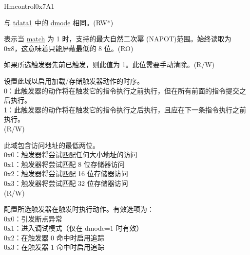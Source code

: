 \begin{register}{H}{mcontrol}{0x7A1}\label{regdesc:MCONTROL}
%
%
%
%
%
%
%
%
%
%
%
%
%
%
%
%
\regnewline%
\begin{regdesc}\begin{reglist}
\label{fielddesc:MCONTROLDMODE}\item [dmode] 与 \hyperref[regdesc:TDATA1]{tdata1} 中的 \hyperref[fielddesc:TDATA1DMODE]{dmode} 相同。(RW*)
\label{fielddesc:MCONTROLMASKMAX}\item [maskmax]
表示当 \hyperref[fielddesc:MCONTROLMATCH]{match} 为 1 时，支持的最大自然二次幂 (NAPOT)范围。始终读取为 0x8，这意味着只能屏蔽最低的 8 位。(RO)
\label{fielddesc:MCONTROLHIT}\item [hit] 如果所选触发器先前已触发，则此值为 1。此位需要手动清除。(R/W)
\label{fielddesc:MCONTROLTIMING}\item [timing] 设置此域以启用加载/存储触发器动作的时序。\\
0：此触发器的动作将在触发它的指令执行之前执行，但在所有前面的指令提交之后执行。\\
1：此触发器的动作将在触发它的指令执行之后执行，且应在下一条指令执行之前执行。\\
(R/W)
\label{fielddesc:MCONTROLSIZELO}\item [sizelo] 此域包含访问地址的最低两位。\\
0x0：触发器将尝试匹配任何大小地址的访问\\
0x1：触发器将尝试匹配 8 位存储器访问\\
0x2：触发器将尝试匹配 16 位存储器访问\\
0x3：触发器将尝试匹配 32 位存储器访问\\
(R/W)
\label{fielddesc:MCONTROLACTION}\item [action] 配置所选触发器在触发时执行动作。有效选项为：\\
0x0：引发断点异常\\
0x1：进入调试模式（仅在 dmode=1 时有效）\\
0x2：在触发器 0 命中时启用追踪\\
0x3：在触发器 1 命中时启用追踪\\

\end{reglist}
\end{regdesc}
\end{register}
